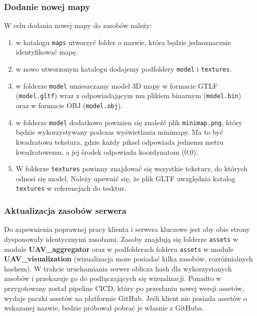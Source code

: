 \documentclass[15pt]{sprawozdanie}
\begin{document}
\subsubsection{Dodanie nowej mapy} \label{add_map}

 W celu dodania nowej mapy do zasobów należy:
 
 \begin{enumerate}
 	\item w katalogu \texttt{maps} utworzyć folder o nazwie, która będzie jednoznacznie identyfikować mapę.
 	\item w nowo utworzonym katalogu dodajemy podfoldery \texttt{model} i \texttt{textures}.
 	\item w folderze \texttt{model} umieszczamy model 3D mapy w formacie GTLF (\texttt{model.gltf}) wraz z odpowiadającym mu plikiem binarnym (\texttt{model.bin}) oraz w formacie OBJ (\texttt{model.obj}).
 	\item w folderze \texttt{model} dodatkowo powinien się znaleźć plik \texttt{minimap.png}, który będzie wykorzystywany podczas wyświetlania minimapy. Ma to być kwadratowa tekstura, gdzie każdy piksel odpowiada jednemu metru kwadratowemu, a jej środek odpowiada koordynatom (0,0).
 	\item W folderze \texttt{textures} powinny znajdować się wszystkie tekstury, do których odnosi się model. Należy upewnić się, że plik GLTF uwzględnia katalog \texttt{textures} w referencjach do tesktur.
 \end{enumerate}

\subsubsection{Aktualizacja zasobów serwera}

Do zapewnienia poprawnej pracy klienta i serwera kluczowe jest aby obie strony dysponowały identycznymi zasobami. Zasoby znajdują się folderze \texttt{assets} w module \textbf{UAV\_aggregator} oraz w podfolderach folderu \texttt{assets} w module \textbf{UAV\_visualization} (wizualizacja moze posiadać kilka zasobów, rozróżnialnych hashem). W trakcie uruchamiania serwer oblicza hash dla wykorzystanych zasobów i przekazuje go do podłączających się wizualizacji. Ponadto w przygotowany został pipeline CICD, który po przesłaniu nowej wersji assetów, wydaje paczki assetów na platformie GitHub. Jeśli klient nie posiada assetów o wskazanej nazwie, bedzie próbował pobrać je własnie z GitHuba.\\
\end{document}
